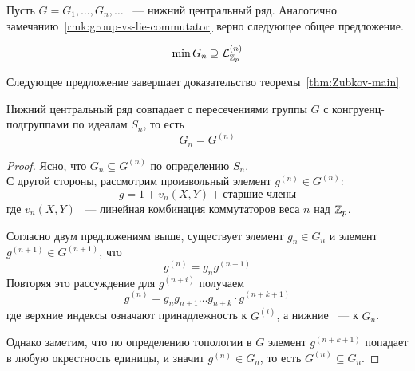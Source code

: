Пусть $G=G_1,\ldots,G_n,\ldots$ ~--- нижний центральный ряд.
Аналогично замечанию~\ref{rmk:group-vs-lie-commutator} верно следующее общее предложение.
\begin{proposition}
    \label{prp:G_n-contains-L_n}
    \[
        \min G_n \supseteq \mathcal{L}^{(n)}_{\mathbb{Z}_p}
    \]
\end{proposition}
Следующее предложение завершает доказательство теоремы~\ref{thm:Zubkov-main}
\vskip 0.1in\noindent
\begin{proposition}
    Нижний центральный ряд совпадает с пересечениями группы $G$ с конгруенц-подгруппами по идеалам $S_n$, то есть
    \[
        G_n = G^{(n)}
    \]
\end{proposition}
\begin{proof}
    Ясно, что $G_n \subseteq G^{(n)}$ по определению $S_n$.\\
    С другой стороны, рассмотрим произвольный элемент $g^{(n)}\in G^{(n)}$:
    \[
        g = 1 + v_n(X, Y) + \text{старшие члены}
    \]
    где $v_n(X,Y)$ ~--- линейная комбинация коммутаторов веса $n$ над $\mathbb{Z}_p$.

    Согласно двум предложениям выше, существует элемент $g_n\in G_n$ и элемент $g^{(n+1)}\in G^{(n+1)}$, что
    \[
        g^{(n)} = g_n g^{(n+1)}
    \]
    Повторяя это рассуждение для $g^{(n+i)}$ получаем
    \[
        g^{(n)} = g_n g_{n+1} \ldots  g_{n+k} \cdot g^{(n+k+1)}
    \]
    где верхние индексы означают принадлежность к $G^{(i)}$, а нижние ~--- к $G_n$.

    Однако заметим, что по определению топологии в $G$ элемент $g^{(n+k+1)}$ попадает в любую окрестность единицы, и значит
    $g^{(n)}\in G_n$, то есть $G^{(n)}\subseteq G_n$.


\end{proof}
